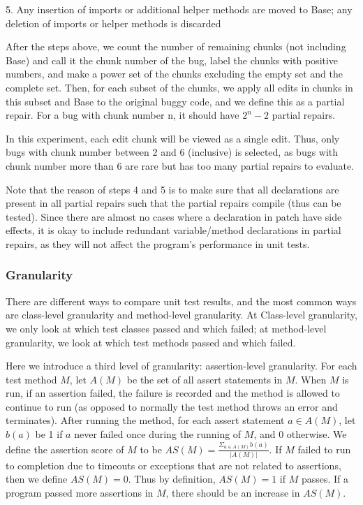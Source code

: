 \documentclass[sigconf, timestamp-false, anonymous=true]{acmart}
\begin{document}
5. Any insertion of imports or additional helper methods are moved to Base; 
any deletion of imports or helper methods is discarded

After the steps above, we count the number of remaining chunks (not including Base) 
and call it the chunk number of the bug, label the chunks with positive numbers, and 
make a power set of the chunks excluding the empty set and the complete set. 
Then, for each subset of the chunks, we apply all edits in chunks in this subset 
and Base to the original buggy code, and we define this as a partial repair. 
For a bug with chunk number n, it should have $2^n-2$ partial repairs. 

In this experiment, each edit chunk will be viewed as a single edit. Thus, only bugs 
with chunk number between 2 and 6 (inclusive) is selected, as bugs with chunk number 
more than 6 are rare but has too many partial repairs to evaluate.

Note that the reason of steps 4 and 5 is to make sure that all declarations are 
present in all partial repairs such that the partial repairs compile (thus can be 
tested). Since there are almost no cases where a declaration in patch have side 
effects, it is okay to include redundant variable/method declarations in partial 
repairs, as they will not affect the program's performance in unit tests. 

\subsubsection{Granularity}

There are different ways to compare unit test results, and the most common ways 
are class-level granularity and method-level granularity. At Class-level granularity, 
we only look at which test classes passed and which failed; at method-level 
granularity, we look at which test methods passed and which failed.

Here we introduce a third level of granularity: assertion-level granularity. 
For each test method $M$, let $A(M)$ be the set of all assert statements in $M$. 
When $M$ is run, if an assertion failed, the failure is recorded and the method 
is allowed to continue to run (as opposed to normally the test method throws an 
error and terminates). After running the method, for each assert statement 
$a\in A(M)$, let $b(a)$ be 1 if $a$ never failed once during the running of $M$, 
and 0 otherwise. We define the assertion score of $M$ to be 
$AS(M)=\frac{\Sigma_{a\in A(M)}b(a)}{|A(M)|}$. If $M$ failed to run to completion 
due to timeouts or exceptions that are not related to assertions, then we define 
$AS(M)=0$. Thus by definition, $AS(M)=1$ if $M$ passes. If a program passed more 
assertions in $M$, there should be an increase in $AS(M)$.
\end{document}
